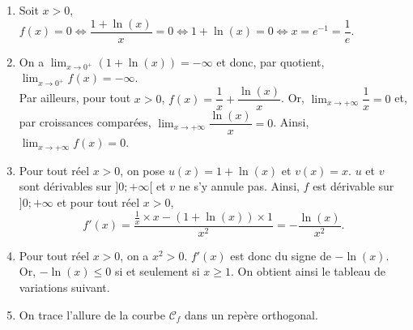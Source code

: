 \documentclass[11pt,fleqn, openany]{book} %
\begin{document}
\begin{solution}\hspace{0pt}

\begin{enumerate}

\item Soit $x>0$, $f(x)=0 \Leftrightarrow \dfrac{1+\ln(x)}{x}=0 \Leftrightarrow 1+\ln(x)=0 \Leftrightarrow x =e^{-1}=\dfrac{1}{e}$.
\item On a $\displaystyle\lim_{x \to 0^+}(1+\ln(x))=-\infty$ et donc, par quotient, $\displaystyle\lim_{x\to0^+}f(x)=-\infty$. \\ Par ailleurs, pour tout $x>0$, $f(x)=\dfrac{1}{x}+\dfrac{\ln(x)}{x}$. Or, $\displaystyle\lim_{x \to + \infty}\dfrac{1}{x}=0$ et, par croissances comparées, $\displaystyle\lim_{x\to+\infty}\dfrac{\ln(x)}{x}=0$. Ainsi, $\displaystyle\lim_{x\to+\infty}f(x)=0$.
\item Pour tout réel $x>0$, on pose $u(x)=1+\ln(x)$ et $v(x)=x$. $u$ et $v$ sont dérivables sur $]0;+\infty[$ et $v$ ne s'y annule pas. Ainsi, $f$ est dérivable sur $]0;+\infty$ et pour tout réel $x>0$, 
\[f'(x)= \dfrac{\frac{1}{x}\times x -(1+\ln(x))\times 1}{x^2} = - \dfrac{\ln(x)}{x^2}.\]

\item Pour tout réel $x>0$, on a $x^2>0$. $f'(x)$ est donc du signe de $-\ln(x)$. Or, $-\ln(x) \leqslant 0$ si et seulement si $x \geqslant 1$. On obtient ainsi le tableau de variations suivant.

\begin{center}
\end{center}


\item On trace l'allure de la courbe $\mathcal{C}_f$ dans un repère orthogonal.


\begin{center}
\end{center}



\end{enumerate}
\end{solution}
\end{document}
